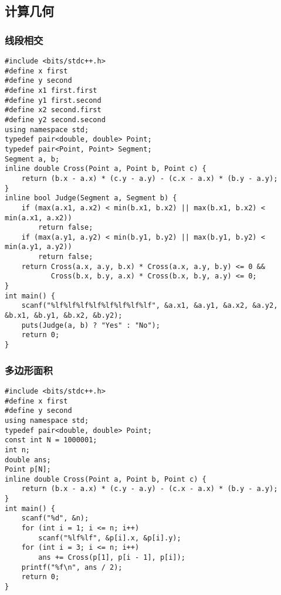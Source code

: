 \documentclass[a4paper]{article}
\begin{document}
\subsection{计算几何}
\subsubsection{线段相交}
\begin{lstlisting}
#include <bits/stdc++.h>
#define x first
#define y second
#define x1 first.first
#define y1 first.second
#define x2 second.first
#define y2 second.second
using namespace std;
typedef pair<double, double> Point;
typedef pair<Point, Point> Segment;
Segment a, b;
inline double Cross(Point a, Point b, Point c) {
    return (b.x - a.x) * (c.y - a.y) - (c.x - a.x) * (b.y - a.y);
}
inline bool Judge(Segment a, Segment b) {
    if (max(a.x1, a.x2) < min(b.x1, b.x2) || max(b.x1, b.x2) < min(a.x1, a.x2))
        return false;
    if (max(a.y1, a.y2) < min(b.y1, b.y2) || max(b.y1, b.y2) < min(a.y1, a.y2))
        return false;
    return Cross(a.x, a.y, b.x) * Cross(a.x, a.y, b.y) <= 0 &&
           Cross(b.x, b.y, a.x) * Cross(b.x, b.y, a.y) <= 0;
}
int main() {
    scanf("%lf%lf%lf%lf%lf%lf%lf%lf", &a.x1, &a.y1, &a.x2, &a.y2, &b.x1, &b.y1, &b.x2, &b.y2);
    puts(Judge(a, b) ? "Yes" : "No");
    return 0;
}
\end{lstlisting}
\subsubsection{多边形面积}
\begin{lstlisting}
#include <bits/stdc++.h>
#define x first
#define y second
using namespace std;
typedef pair<double, double> Point;
const int N = 1000001;
int n;
double ans;
Point p[N];
inline double Cross(Point a, Point b, Point c) {
    return (b.x - a.x) * (c.y - a.y) - (c.x - a.x) * (b.y - a.y);
}
int main() {
    scanf("%d", &n);
    for (int i = 1; i <= n; i++)
        scanf("%lf%lf", &p[i].x, &p[i].y);
    for (int i = 3; i <= n; i++)
        ans += Cross(p[1], p[i - 1], p[i]);
    printf("%f\n", ans / 2);
    return 0;
}
\end{lstlisting}
\end{document}
